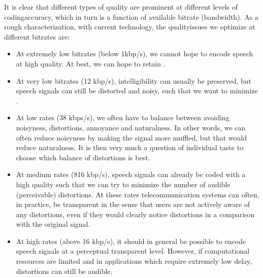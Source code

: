 \documentclass[letterpaper,10pt,english]{jupyterBook}
\begin{document}
\sphinxAtStartPar
It is clear that different types of quality are prominent at different
levels of coding\sphinxhyphen{}accuracy, which in turn is a function of available
bitrate (bandwidth). As a rough characterization, with current
technology, the quality\sphinxhyphen{}issues we optimize at different bitrates are:
\begin{itemize}
\item {} 
\sphinxAtStartPar
At extremely low bitrates (below 1kbp/s), we cannot hope to encode
speech at high quality. At best, we can hope to retain
.

\item {} 
\sphinxAtStartPar
At very low bitrates (1\sphinxhyphen{}2 kbp/s), intelligibility can usually be
preserved, but speech signals can still be distorted and noisy, such
that we want to minimize .

\item {} 
\sphinxAtStartPar
At low rates (3\sphinxhyphen{}8 kbps/s), we often have to balance between avoiding
noisyness, distortions, annoyance and naturalness. In other words,
we can often reduce noisyness by making the signal more muffled, but
that would reduce naturalness. It is then very much a question of
individual taste to choose which balance of distortions is best.

\item {} 
\sphinxAtStartPar
At medium rates (8\sphinxhyphen{}16 kbp/s), speech signals can already be coded
with a high quality such that we can try to minimize the number of
audible (perceivable) distortions. At these rates telecommunication
systems can often, in practice, be transparent in the sense that
users are not actively aware of any distortions, even if they would
clearly notice distortions in a comparison with the original signal.

\item {} 
\sphinxAtStartPar
At high rates (above 16 kbp/s), it should in general be possible to
encode speech signals at a perceptual transparent level. However, if
computational resources are limited and in applications which
require extremely low delay, distortions can still be audible.

\end{itemize}
\end{document}

